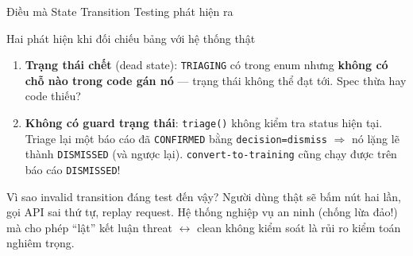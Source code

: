 \documentclass[aspectratio=169,12pt]{beamer}
\begin{document}
\begin{frame}{Điều mà State Transition Testing phát hiện ra}
  \begin{alertblock}{Hai phát hiện khi đối chiếu bảng với hệ thống thật}
    \small
    \begin{enumerate}
      \item \textbf{Trạng thái chết} (dead state): \texttt{TRIAGING} có trong
        enum nhưng \textbf{không có chỗ nào trong code gán nó} --- trạng thái
        không thể đạt tới. Spec thừa hay code thiếu?
      \item \textbf{Không có guard trạng thái}: \texttt{triage()} không kiểm tra
        status hiện tại. Triage lại một báo cáo đã \texttt{CONFIRMED} bằng
        \texttt{decision=dismiss} $\Rightarrow$ nó lặng lẽ thành
        \texttt{DISMISSED} (và ngược lại). \texttt{convert-to-training} cũng
        chạy được trên báo cáo \texttt{DISMISSED}!
    \end{enumerate}
  \end{alertblock}

  \vspace{0.3em}
  \begin{block}{Vì sao invalid transition đáng test đến vậy?}
    \small Người dùng thật sẽ bấm nút hai lần, gọi API sai thứ tự, replay request.
    Hệ thống nghiệp vụ an ninh (chống lừa đảo!) mà cho phép ``lật'' kết luận
    threat $\leftrightarrow$ clean không kiểm soát là rủi ro kiểm toán nghiêm trọng.
  \end{block}
\end{frame}
\end{document}
